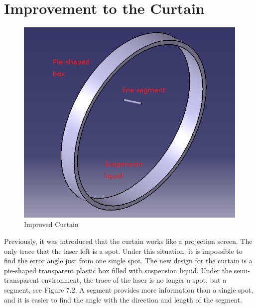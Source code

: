 \section{Improvement to the Curtain}
\begin{figure}[ht!]
\begin{center}
\includegraphics[scale = 0.8]{pics/improvedcurtain.png}
\caption{Improved Curtain}
\end{center}
\end{figure}
Previously, it was introduced that the curtain works like a projection screen. The only trace that the laser left is a spot. Under this situation, it is impossible to find the error angle just from one single spot. The new design for the curtain is a pie-shaped transparent plastic box filled with suspension liquid. Under the semi-transparent environment, the trace of the laser is no longer a spot, but a segment, see Figure 7.2. A segment provides more information than a single spot, and it is easier to find the angle with the direction and length of the segment.

